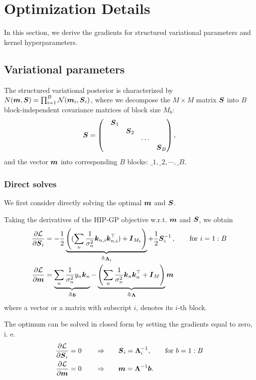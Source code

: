 \section{Optimization Details}
In this section, we derive the gradients for structured variational parameters and kernel hyperparameters.
\subsection{Variational parameters}
The structured variational posterior is characterized by $N(\boldsymbol{m}, \boldsymbol{S})=\prod_{i=1}^B \mathcal{N}(\boldsymbol{m}_i, \boldsymbol{S}_i)$,
where we decompose the $M\times M$ matrix $\boldsymbol{S}$  into $B$ block-independent covariance matrices of block size $M_b$:
\begin{align}
  \boldsymbol{S} = \begin{pmatrix}
& \boldsymbol{S}_1 \\
& & \boldsymbol{S}_2 \\
&&&\cdots \\
&&&& \boldsymbol{S}_B
\end{pmatrix},
\end{align}
and the vector $\boldsymbol{m}$ into corresponding $B$ blocks: $\bm_1, \bm_2, \cdots, \bm_B$.

\subsubsection{Direct solves}
We first consider directly solving the optimal $\boldsymbol{m}$ and $\boldsymbol{S}$.

Taking the derivatives of the HIP-GP objective w.r.t. $\boldsymbol{m}$ and $\boldsymbol{S}$, we obtain
\begin{align}
  \frac{\partial \mathcal{L}}{\partial \boldsymbol{S}_i}
  &= -\frac{1}{2} \underbrace{\left((\sum_n \frac{1}{\sigma_n^2} \boldsymbol{k}_{n,i} \boldsymbol{k}_{n,i}^\top) + \boldsymbol{I}_{M_b} \right)}_{\triangleq {\boldsymbol{\Lambda}}_i} + \frac{1}{2} \boldsymbol{S}_i^{-1}
  \,, \qquad \textrm{for } i = 1:B \\
\frac{\partial \mathcal{L}}{ \partial \boldsymbol{m}} &= \underbrace{ \sum_n \frac{1}{\sigma_n^2} y_n \boldsymbol{k}_n}_{\triangleq \boldsymbol{b}}
    - \underbrace{\left(\sum_n \frac{1}{\sigma_n^2}\boldsymbol{k}_n \boldsymbol{k}_n^\top + \boldsymbol{I}_M \right)}_{\triangleq {\boldsymbol{\Lambda}}} \boldsymbol{m}
\end{align}
where a vector or a matrix with subscript $i$, denotes its $i$-th block.

The optimum can be solved in closed form by setting the gradients equal to zero, i. e.
\begin{align}
  \frac{\partial \mathcal{L}}{\partial \boldsymbol{S}_i} = 0 \qquad  \Rightarrow  \qquad &\boldsymbol{S}_i = {\boldsymbol{\Lambda}}_i^{-1}, \qquad \textrm{for } b=1:B \\
  \frac{\partial \mathcal{L}}{ \partial \boldsymbol{m}} = 0 \qquad  \Rightarrow   \qquad &\boldsymbol{m}   = {\boldsymbol{\Lambda}}^{-1} \boldsymbol{b} .
\end{align}

